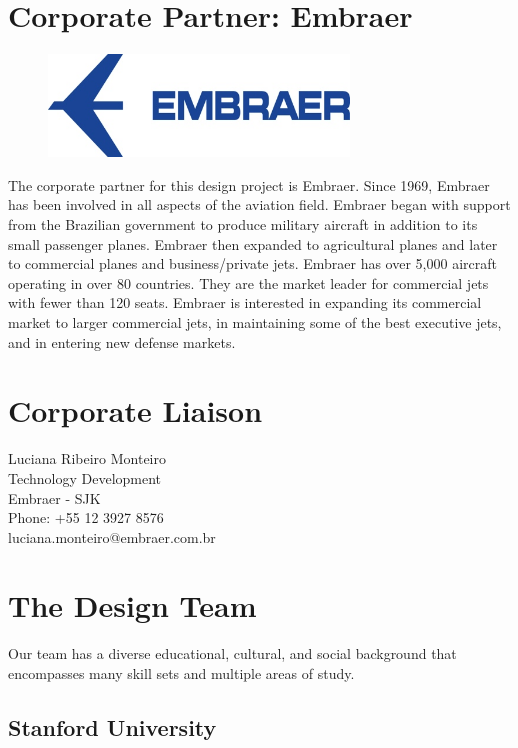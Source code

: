 \section{Corporate Partner: Embraer}

\begin{figure}[h]
  \centering
     \includegraphics[width=8cm]{images/image010.jpg}
  \label{fig:10}
\end{figure}

The corporate partner for this design project is Embraer.  Since 1969, Embraer has been involved in all aspects of the aviation field.  Embraer began with support from the Brazilian government to produce military aircraft in addition to its small passenger planes.  Embraer then expanded to agricultural planes and later to commercial planes and business/private jets.  Embraer has over 5,000 aircraft operating in over 80 countries.  They are the market leader for commercial jets with fewer than 120 seats.  Embraer is interested in expanding its commercial market to larger commercial jets, in maintaining some of the best executive jets, and in entering new defense markets.

\section*{Corporate Liaison}
Luciana Ribeiro Monteiro \\
  Technology Development \\
  Embraer - SJK \\
  Phone: +55 12 3927 8576 \\
  luciana.monteiro@embraer.com.br

\section{The Design Team}
Our team has a diverse educational, cultural, and social background that encompasses many skill sets and multiple areas of study. 

\subsection*{Stanford University}


